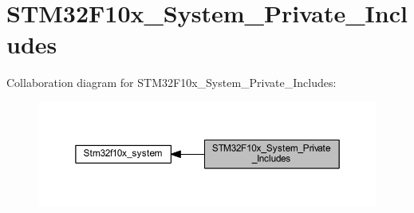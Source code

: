 \hypertarget{group___s_t_m32_f10x___system___private___includes}{}\section{S\+T\+M32\+F10x\+\_\+\+System\+\_\+\+Private\+\_\+\+Includes}
\label{group___s_t_m32_f10x___system___private___includes}
Collaboration diagram for S\+T\+M32\+F10x\+\_\+\+System\+\_\+\+Private\+\_\+\+Includes\+:
\nopagebreak
\begin{figure}[H]
\begin{center}
\leavevmode
\includegraphics[width=350pt]{group___s_t_m32_f10x___system___private___includes}
\end{center}
\end{figure}
